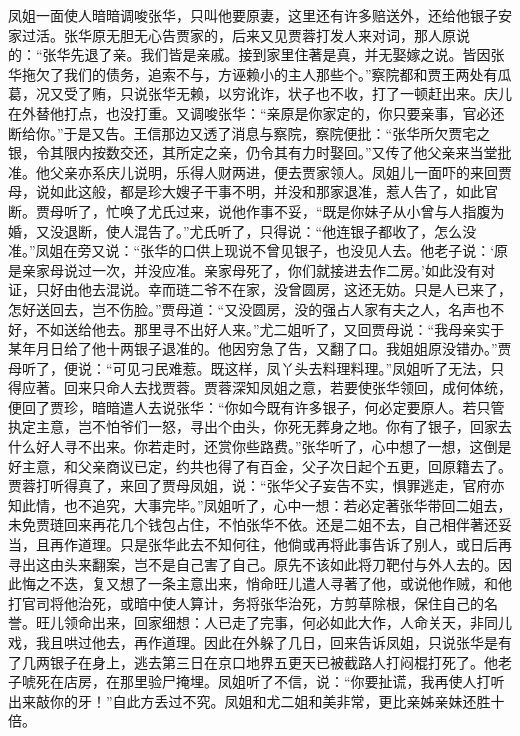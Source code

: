 \begin{parag}


    凤姐一面使人暗暗调唆张华，只叫他要原妻，这里还有许多赔送外，还给他银子安家过活。张华原无胆无心告贾家的，后来又见贾蓉打发人来对词，那人原说的：“张华先退了亲。我们皆是亲戚。接到家里住著是真，并无娶嫁之说。皆因张华拖欠了我们的债务，追索不与，方诬赖小的主人那些个。”察院都和贾王两处有瓜葛，况又受了贿，只说张华无赖，以穷讹诈，状子也不收，打了一顿赶出来。庆儿在外替他打点，也没打重。又调唆张华：“亲原是你家定的，你只要亲事，官必还断给你。”于是又告。王信那边又透了消息与察院，察院便批：“张华所欠贾宅之银，令其限内按数交还，其所定之亲，仍令其有力时娶回。”又传了他父亲来当堂批准。他父亲亦系庆儿说明，乐得人财两进，便去贾家领人。凤姐儿一面吓的来回贾母，说如此这般，都是珍大嫂子干事不明，并没和那家退准，惹人告了，如此官断。贾母听了，忙唤了尤氏过来，说他作事不妥，“既是你妹子从小曾与人指腹为婚，又没退断，使人混告了。”尤氏听了，只得说：“他连银子都收了，怎么没准。”凤姐在旁又说：“张华的口供上现说不曾见银子，也没见人去。他老子说：‘原是亲家母说过一次，并没应准。亲家母死了，你们就接进去作二房。’如此没有对证，只好由他去混说。幸而琏二爷不在家，没曾圆房，这还无妨。只是人已来了，怎好送回去，岂不伤脸。”贾母道：“又没圆房，没的强占人家有夫之人，名声也不好，不如送给他去。那里寻不出好人来。”尤二姐听了，又回贾母说：“我母亲实于某年月日给了他十两银子退准的。他因穷急了告，又翻了口。我姐姐原没错办。”贾母听了，便说：“可见刁民难惹。既这样，凤丫头去料理料理。”凤姐听了无法，只得应著。回来只命人去找贾蓉。贾蓉深知凤姐之意，若要使张华领回，成何体统，便回了贾珍，暗暗遣人去说张华：“你如今既有许多银子，何必定要原人。若只管执定主意，岂不怕爷们一怒，寻出个由头，你死无葬身之地。你有了银子，回家去什么好人寻不出来。你若走时，还赏你些路费。”张华听了，心中想了一想，这倒是好主意，和父亲商议已定，约共也得了有百金，父子次日起个五更，回原籍去了。贾蓉打听得真了，来回了贾母凤姐，说：“张华父子妄告不实，惧罪逃走，官府亦知此情，也不追究，大事完毕。”凤姐听了，心中一想：若必定著张华带回二姐去，未免贾琏回来再花几个钱包占住，不怕张华不依。还是二姐不去，自己相伴著还妥当，且再作道理。只是张华此去不知何往，他倘或再将此事告诉了别人，或日后再寻出这由头来翻案，岂不是自己害了自己。原先不该如此将刀靶付与外人去的。因此悔之不迭，复又想了一条主意出来，悄命旺儿遣人寻著了他，或说他作贼，和他打官司将他治死，或暗中使人算计，务将张华治死，方剪草除根，保住自己的名誉。旺儿领命出来，回家细想：人已走了完事，何必如此大作，人命关天，非同儿戏，我且哄过他去，再作道理。因此在外躲了几日，回来告诉凤姐，只说张华是有了几两银子在身上，逃去第三日在京口地界五更天已被截路人打闷棍打死了。他老子唬死在店房，在那里验尸掩埋。凤姐听了不信，说：“你要扯谎，我再使人打听出来敲你的牙！”自此方丢过不究。凤姐和尤二姐和美非常，更比亲姊亲妹还胜十倍。
\end{parag}


